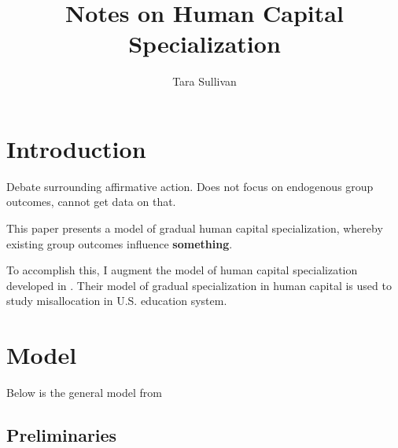 \documentclass[10 pt]{article}
\begin{document}
\title{Notes on Human Capital Specialization}
\author{Tara Sullivan}

\maketitle
\onehalfspacing

\noindent{}

\section{Introduction}

\begin{outline}

\item {} Debate surrounding affirmative action. Does not focus on endogenous group outcomes, cannot get data on that. 

\item This paper presents a model of gradual human capital specialization, whereby existing group outcomes influence \textbf{something}.

\item To accomplish this, I augment the model of human capital specialization developed in \textcite{AF20}. Their model of gradual specialization in human capital is used to study misallocation in U.S. education system. 


\end{outline}

\section{Model}

Below is the general model from \textcite{AF20}

\subsection{Preliminaries}
\end{document}
